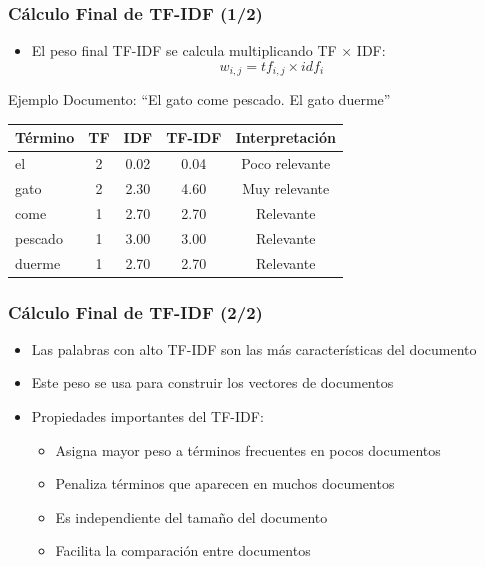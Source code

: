 \documentclass[handout]{beamer}
\begin{document}
\begin{frame}\frametitle{Cálculo Final de TF-IDF (1/2)}
\begin{itemize}
    \item El peso final TF-IDF se calcula multiplicando TF × IDF:
    \[ w_{i,j} = tf_{i,j} \times idf_i \]
\end{itemize}

\begin{block}{Ejemplo}
\vspace{0.5em}
  Documento: ``El gato come pescado. El gato duerme''
\begin{table}[h]
\centering
\begin{tabular}{|l|c|c|c|c|}
\hline
\textbf{Término} & \textbf{TF} & \textbf{IDF} & \textbf{TF-IDF} & \textbf{Interpretación} \\
\hline
el & 2 & 0.02 & 0.04 & Poco relevante \\
gato & 2 & 2.30 & 4.60 & Muy relevante \\
come & 1 & 2.70 & 2.70 & Relevante \\
pescado & 1 & 3.00 & 3.00 & Relevante \\
duerme & 1 & 2.70 & 2.70 & Relevante \\
\hline
\end{tabular}
\end{table}
\end{block}
\end{frame}

\begin{frame}\frametitle{Cálculo Final de TF-IDF (2/2)}
\begin{itemize}
    \item Las palabras con alto TF-IDF son las más características del documento
    \item Este peso se usa para construir los vectores de documentos
    \item Propiedades importantes del TF-IDF:
    \begin{itemize}
        \item Asigna mayor peso a términos frecuentes en pocos documentos
        \item Penaliza términos que aparecen en muchos documentos
        \item Es independiente del tamaño del documento
        \item Facilita la comparación entre documentos
    \end{itemize}
\end{itemize}
\end{frame}
\end{document}
